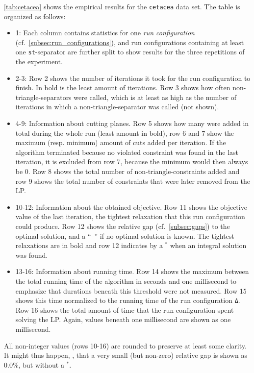 \begin{landscape}
\cref{tab:cetacea} shows the empirical results for the \texttt{cetacea} data set.
The table is organized as follows:
\begin{itemize}
	\item 1: Each column contains statistics for one \textit{run configuration} (cf.\ \cref{subsec:run_configurations}),
		and run configurations containing at least one \texttt{st}-separator are further split to show results for the three repetitions of the experiment.
	\item 2-3: Row 2 shows the number of iterations it took for the run configuration to finish. 
		In bold is the least amount of iterations.
		Row 3 shows how often non-triangle-separators were called, which is at least as high as the number of iterations in which a non-triangle-separator was called (not shown).
	\item 4-9: Information about cutting planes. 
		Row 5 shows how many were added in total during the whole run (least amount in bold),
		row 6 and 7 show the maximum (resp. minimum) amount of cuts added per iteration.
		If the algorithm terminated because no violated constraint was found in the last iteration, it is excluded from row 7, because the minimum would then always be 0.
		Row 8 shows the total number of non-triangle-constraints added
		and row 9 shows the total number of constraints that were later removed from the LP.
	\item 10-12: Information about the obtained objective.
		Row 11 shows the objective value of the last iteration, \ie the tightest relaxation that this run configuration could produce.
		Row 12 shows the relative gap (cf.\ \cref{subsec:gaps}) to the optimal solution, and a “–” if no optimal solution is known.
		The tightest relaxations are in bold and row 12 indicates by a $^{*}$ when an integral solution was found.
	\item 13-16: Information about running time.
		Row 14 shows the maximum between the total running time of the algorithm in seconds and one millisecond to emphasize that durations beneath this threshold were not measured.
		Row 15 shows this time normalized to the running time of the run configuration \texttt{Δ}.
		Row 16 shows the total amount of time that the run configuration spent solving the LP. Again, values beneath one millisecond are shown as one millisecond.
\end{itemize}
All non-integer values (rows 10-16) are rounded to preserve at least some clarity.
It might thus happen, \eg, that a very small (but non-zero) relative gap is shown as $0.0\%$, but without a $^{*}$.


\end{landscape}
